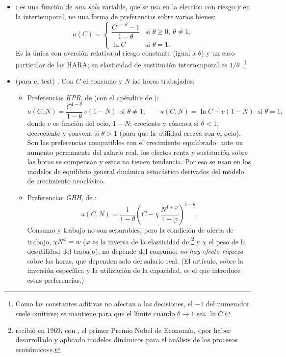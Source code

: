 \documentclass[11pt]{article}
\begin{document}
\begin{itemize}
\item {}: es una función de \emph{una sola} variable, que se usa en la elección con riesgo y en la intertemporal, no una forma de preferencias sobre varios bienes:
  \begin{equation}
  u(C)=\begin{cases}\dfrac{C^{1-\theta}-1}{1-\theta} & \text{si } \theta\geq 0,\ \theta\neq 1,\\[6pt] \ln C & \text{si } \theta=1.\end{cases} \label{eq:crra}
  \end{equation}
  Es la única con aversión relativa al riesgo constante (igual a $\theta$) y un caso particular de las HARA; su elasticidad de sustitución intertemporal es $1/\theta$  .\footnote{Como las constantes aditivas no afectan a las decisiones, el $-1$ del numerador suele omitirse; se mantiene para que el límite cuando $\theta\to 1$ sea $\ln C$.}
\item {} (para el test) . Con $C$ el consumo y $N$ las horas trabajadas:
  \begin{itemize}
  \item Preferencias \emph{KPR}, de \textcite{KingPlosserRebelo1988Production} (con el apéndice de \textcite{KingPlosserRebelo2002Appendix}):
    \begin{equation}
    u(C,N)=\frac{C^{1-\theta}}{1-\theta}\,v(1-N)\ \text{ si }\theta\neq 1,\qquad u(C,N)=\ln C+v(1-N)\ \text{ si }\theta=1, \label{eq:kpr}
    \end{equation}
    donde $v$ es función del ocio, $1-N$: creciente y cóncava si $\theta<1$, decreciente y convexa si $\theta>1$ (para que la utilidad crezca con el ocio). Son las preferencias compatibles con el crecimiento equilibrado: ante un aumento permanente del salario real, los efectos renta y sustitución sobre las horas se compensan y estas no tienen tendencia. Por eso se usan en los modelos de equilibrio general dinámico estocástico derivados del modelo de crecimiento neoclásico.
  \item Preferencias \emph{GHH}, de \textcite{GreenwoodHercowitzHuffman1988}:
    \begin{equation}
    u(C,N)=\frac{1}{1-\theta}\left(C-\chi\,\frac{N^{1+\varphi}}{1+\varphi}\right)^{1-\theta}. \label{eq:ghh}
    \end{equation}
    Consumo y trabajo no son separables, pero la condición de oferta de trabajo, $\chi N^{\varphi}=w$ ($\varphi$ es la inversa de la elasticidad de \footnote{ recibió en 1969, con , el primer Premio Nobel de Economía, «por haber desarrollado y aplicado modelos dinámicos para el análisis de los procesos económicos»\nocite{Nobel1969}.} y $\chi$ el peso de la desutilidad del trabajo), no depende del consumo: \emph{no hay efecto riqueza} sobre las horas, que dependen solo del salario real. (El artículo, sobre la inversión específica y la utilización de la capacidad, es el que introduce estas preferencias.)

\end{itemize}
\end{itemize}
\end{document}
